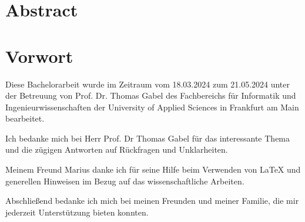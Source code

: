 \ifdefined\ThesisLanguageIsEnglish
\chapter*{Abstract}
\else
\chapter*{Vorwort}
\fi
\label{ch:Abstract}

Diese Bachelorarbeit wurde im Zeitraum vom 18.03.2024 zum 21.05.2024 unter der Betreuung von Prof. Dr. Thomas Gabel des Fachbereichs für Informatik und Ingenieurwissenschaften der University of Applied Sciences in Frankfurt am Main bearbeitet.

\hspace{8mm}

\noindent Ich bedanke mich bei Herr Prof. Dr Thomas Gabel für das interessante Thema und die zügigen Antworten auf Rückfragen und Unklarheiten.

\hspace{8mm}

\noindent Meinem Freund Marius danke ich für seine Hilfe beim Verwenden von LaTeX und generellen Hinweisen im Bezug auf das wissenschaftliche Arbeiten.

\hspace{8mm}

\noindent Abschließend bedanke ich mich bei meinen Freunden und meiner Familie, die mir jederzeit Unterstützung bieten konnten.